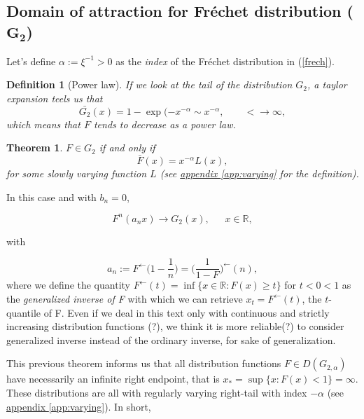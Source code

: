 \documentclass[11pt,a4paper,openany ]{book}
\newtheorem{theorem}{Theorem}[chapter]
\newtheorem{definition}{Definition}[chapter]
\begin{document}
\subsection*{Domain of attraction for Fréchet distribution ($\mathbf{G_{2}}$)}

Let's define $\alpha:=\xi^{-1}>0$ as the \emph{index} of the Fréchet distribution in (\ref{frech}).
\begin{definition}[Power law]
If we look at the tail of the distribution $G_2$, a taylor expansion teels us that
\begin{equation}
\bar{G_2}(x)=1-\exp (-x^{-\alpha}\sim x^{-\alpha}, \qquad <\to\infty, 
\end{equation}
which means that $F$ tends to decrease as a power law. 
\end{definition}


\begin{theorem}
$F \in G_{2}$ if and only if 
\begin{equation}
\bar{F}(x)=x^{-\alpha} L(x),
\end{equation}
for some \emph{slowly varying} function $L$ (see \hyperref[app:varying]{appendix \ref{app:varying}} for the definition). 
\end{theorem}

In this case and with $b_n=0$,

\begin{equation*}
F^n(a_nx)\to G_2(x), \ \ \ \ \ \ \  x\in\mathbb{R},
\end{equation*}

with

\begin{equation*}
a_n:=F^{\leftarrow}\big(1-\frac{1}{n}\big)=\Big(\frac{1}{1-F}\Big)^{\leftarrow}(n),
\end{equation*}
where we define the quantity $F^{\leftarrow}(t)=\inf\{x\in\mathbb{R}:F(x)\geq t\}$ for $t<0<1$ as the \emph{generalized inverse of F} with which we can retrieve $x_t=F^{\leftarrow}(t)$, the $t$-quantile of F. Even if we deal in this text only with continuous and strictly increasing distribution functions (?), we think it is more reliable(?) to consider generalized inverse instead of the ordinary inverse, for sake of generalization.

This previous theorem informs us that all distribution functions $F\in D(G_{2,\alpha})$ have necessarily an infinite right endpoint, that is $x_*=\sup\{x:F(x)<1\}=\infty$. These distributions are all with regularly varying right-tail with index $-\alpha$ (see \hyperref[app:varying]{appendix \ref{app:varying}}). In short,
\end{document}

